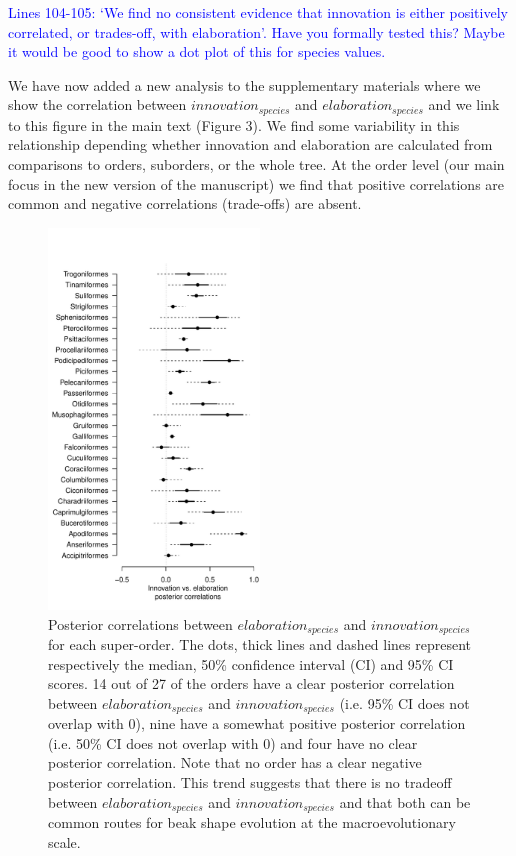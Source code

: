 \documentclass[12pt,letterpaper]{article}
\begin{document}
\textcolor{blue}{Lines 104-105: ‘We find no consistent evidence that innovation is either positively correlated, or trades-off, with elaboration’. Have you formally tested this? Maybe it would be good to show a dot plot of this for species values.}

We have now added a new analysis to the supplementary materials where we show the correlation between $innovation_{species}$ and $elaboration_{species}$ and we link to this figure in the main text (Figure 3). We find some variability in this relationship depending whether innovation and elaboration are calculated from comparisons to orders, suborders, or the whole tree. At the order level (our main focus in the new version of the manuscript) we find that positive correlations are common and negative correlations (trade-offs) are absent.


\begin{figure}[!htbp]
\centering
   \includegraphics[width=0.5\textwidth]{Figures/correlations_fable_orders.pdf}
\caption{Posterior correlations between $elaboration_{species}$ and $innovation_{species}$ for each super-order. The dots, thick lines and dashed lines represent respectively the median, 50\% confidence interval (CI) and 95\% CI scores. 14 out of 27 of the orders have a clear posterior correlation between $elaboration_{species}$ and $innovation_{species}$ (i.e. 95\% CI does not overlap with 0), nine have a somewhat positive posterior correlation (i.e. 50\% CI does not overlap with 0) and four have no clear posterior correlation. Note that no order has a clear negative posterior correlation. This trend suggests that there is no tradeoff between $elaboration_{species}$ and $innovation_{species}$ and that both can be common routes for beak shape evolution at the macroevolutionary scale.
}
\label{fable_correlations}
\end{figure}
\bigskip
\end{document}
